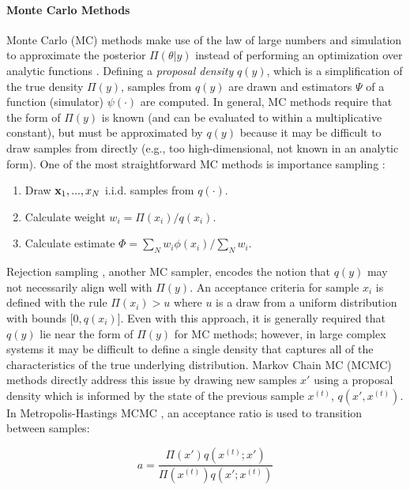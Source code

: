 \paragraph{Monte Carlo Methods}
Monte Carlo (MC) methods make use of the law of large numbers and simulation to approximate the posterior $\Pi(\theta|y)$ instead of performing an optimization over analytic functions \autocite{mackay1998introduction}. Defining a \emph{proposal density} $q(y)$, which is a simplification of the true density $\Pi(y)$, samples from $q(y)$ are drawn and estimators $\Psi$ of a function (simulator) $\psi(\cdot)$ are computed. In general, MC methods require that the form of $\Pi(y)$ is known (and can be evaluated to within a multiplicative constant), but must be approximated by $q(y)$ because it may be difficult to draw samples from directly (e.g., too high-dimensional, not known in an analytic form). One of the most straightforward MC methods is importance sampling \autocite{glynn1989importance}:

\begin{enumerate}
    \item Draw $\mathbf{x}_1,...,x_N$ i.i.d. samples from $q(\cdot)$.
    \item Calculate weight $w_i = \Pi(x_i) / q(x_i)$.
    \item Calculate estimate $\Phi = \sum_{N} w_i \phi(x_i) / \sum_N w_i$.
\end{enumerate}

Rejection sampling \autocite{mackay1998introduction}, another MC sampler, encodes the notion that $q(y)$ may not necessarily align well with $\Pi(y)$. An acceptance criteria for sample $x_i$ is defined with the rule $\Pi(x_i) > u$ where $u$ is a draw from a uniform distribution with bounds [$0, q(x_i)$]. Even with this approach, it is generally required that $q(y)$ lie near the form of $\Pi(y)$ for MC methods; however, in large complex systems it may be difficult to define a single density that captures all of the characteristics of the true underlying distribution. Markov Chain MC (MCMC) methods directly address this issue by drawing new samples $x'$ using a proposal density which is informed by the state of the previous sample $x^{(t)}$, $q(x',x^{(t)})$. In Metropolis-Hastings MCMC \autocite{liu1996metropolized,metropolis1953equation}, an acceptance ratio is used to transition between samples:

\begin{equation}
    a = \frac{\Pi(x')q(x^{(t)}; x')}{\Pi(x^{(t)})q(x'; x^{(t)})}
\end{equation}

